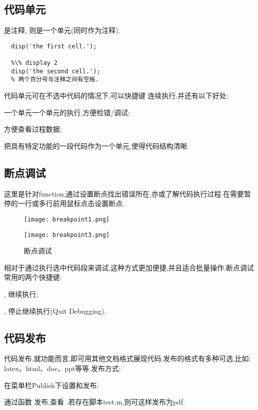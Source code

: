 
\subsection{代码单元}
\mcode{\%} 是注释, \mcode{\%\%} 则是一个单元(同时作为注释). 

\vspace{-0.8cm}
\begin{lstlisting}[caption=代码单元]
  %\% display 1
  disp('the first cell.');

  %\% display 2
  disp('the second cell.');
  % 两个百分号与注释之间有空格.
\end{lstlisting}

代码单元可在不选中代码的情况下,可以快捷键  连续执行.并还有以下好处:
\begindot
  \item 一个单元一个单元的执行,方便检错/调试;
  \item 方便查看过程数据;
  \item 把具有特定功能的一段代码作为一个单元,使得代码结构清晰.
\myenddot




\subsection{断点调试}
这里是针对function,通过设置断点找出错误所在,亦或了解代码执行过程.在需要暂停的一行或多行前用鼠标点击设置断点.

\begin{figure}[htbp]
  \centering
  \texttt{[image: breakpoint1.png]}
\end{figure}

\begin{figure}[htbp]
  \centering
  \texttt{[image: breakpoint3.png]}
  \caption{断点调试}
\end{figure}

相对于通过执行选中代码段来调试,这种方式更加便捷,并且适合批量操作.断点调试常用的两个快捷键:
\begindot
  \item {}, 继续执行;
  \item {}, 停止继续执行(Quit Debugging).
\myenddot



\subsection{代码发布}
 代码发布,就功能而言,即可用其他文档格式展现代码.发布的格式有多种可选,比如: latex、html、doc、ppt等等.发布方式:
 \begindot
  \item 在菜单栏Publish下设置和发布;
  \item 通过函数  发布,查看 .若存在脚本test.m,则可这样发布为pdf.


